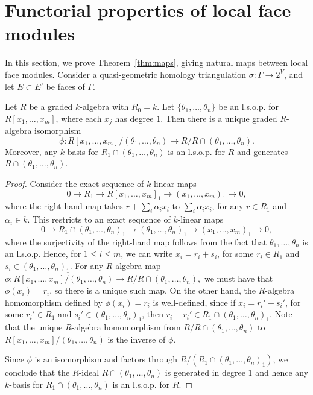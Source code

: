 \section{Functorial properties of local face modules}

In this section, we prove Theorem~\ref{thm:maps}, giving natural maps between local face modules.  
Consider a quasi-geometric homology triangulation $\sigma\colon \Gamma \to 2^V$, and let $E \subset E'$ be faces of $\Gamma$.




\begin{lemma}\label{lemma:lsop}
Let $R$ be a graded $k$-algebra with $R_0 = k$. Let $\{ \theta_1, \dotsc, \theta_n \}$ be an l.s.o.p. for $R[x_1, \dotsc, x_m]$, where each $x_j$ has  degree $1$. Then there is a unique graded $R$-algebra isomorphism 
\[
\phi \colon R[x_1, \dotsc, x_m]/(\theta_1, \dotsc, \theta_n) \rightarrow R/R \cap (\theta_1, \dotsc, \theta_n).
\]
Moreover, any $k$-basis for $R_1 \cap (\theta_1, \dotsc, \theta_n)$ is an l.s.o.p. for $R$ and generates $R \cap (\theta_1, \dotsc, \theta_n)$.  
\end{lemma}

\begin{proof}
Consider the exact sequence of $k$-linear maps
\[
0 \rightarrow R_1 \rightarrow R[x_1, \dotsc, x_m]_1 \rightarrow (x_1,\dotsc, x_m)_1 \rightarrow 0,
\]
where the right hand map takes $r + \sum_i \alpha_i x_i$ to $\sum_i \alpha_i x_i$, for any $r \in R_1$ and $\alpha_i \in k$. This restricts to an exact sequence of $k$-linear maps
\[
0 \rightarrow R_1 \cap (\theta_1, \dotsc, \theta_n)_1 \rightarrow (\theta_1, \dotsc, \theta_n)_1 \rightarrow (x_1,\dotsc, x_m)_1 \rightarrow 0,
\]
where the surjectivity of the right-hand map follows from the fact that $\theta_1, \dotsc, \theta_n$ is an l.s.o.p. Hence, for $1 \le i \le m$, we can write $x_i = r_i + s_i$, for some $r_i \in R_1$ and $s_i \in (\theta_1, \dotsc, \theta_n)_1$. For any $R$-algebra map $\phi \colon R[x_1, \dotsc, x_m]/(\theta_1, \dotsc, \theta_n) \rightarrow R/R \cap (\theta_1, \dotsc, \theta_n),$ we must have that $\phi(x_i) = r_i$, so there is a unique such map. On the other hand, the $R$-algebra homomorphism defined by $\phi(x_i) = r_i$ is well-defined, since if $x_i = r_i' + s_i'$, for some $r_i' \in R_1$ and $s_i' \in (\theta_1, \dotsc, \theta_n)_1$, then $r_i - r_i' \in R_1 \cap (\theta_1, \dotsc, \theta_n)_1$. Note that the unique $R$-algebra homomorphism from $R/R \cap (\theta_1, \dotsc, \theta_n)$ to  $R[x_1, \dotsc, x_m]/(\theta_1, \dotsc, \theta_n)$ is the inverse of $\phi$.

Since $\phi$ is an isomorphism and factors through $R/(R_1 \cap (\theta_1, \dotsc, \theta_n)_1)$, we conclude that the $R$-ideal $R \cap (\theta_1, \dotsc, \theta_n)$ is generated in degree $1$ and hence any $k$-basis for $R_1 \cap (\theta_1, \dotsc, \theta_n)$ is an l.s.o.p. for $R$.
\end{proof}

